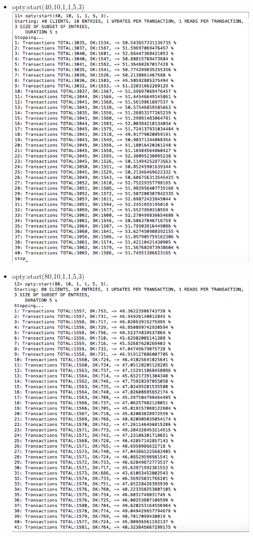 \documentclass[a4paper, 11pt]{article}
\begin{document}
\begin{itemize}
\item opty:start(40,10,1,1,5,3)\\
\includegraphics[scale=0.5]{images/exp-i-5.png} \\
\item opty:start(80,10,1,1,5,3)\\
\includegraphics[scale=0.5]{images/exp-i-6a.png} \\

\end{itemize}
\end{document}
